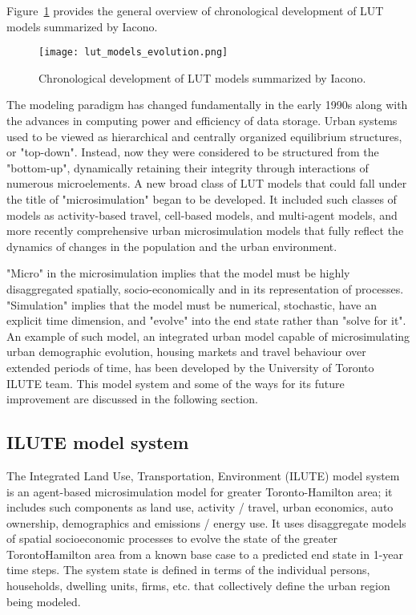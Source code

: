 Figure~\ref{fig:lut_model_evolution} provides the general overview of chronological development of LUT models summarized by Iacono\cite{Iacono2008}.

\begin{figure}[hbt!]
    \centering
    \texttt{[image: lut\_models\_evolution.png]}
    \caption{Chronological development of LUT models summarized by Iacono\cite{Iacono2008}.}
    \label{fig:lut_model_evolution}
\end{figure}

The modeling paradigm has changed fundamentally in the early 1990s along with the advances in computing power and efficiency of data storage.
Urban systems used to be viewed as hierarchical and centrally organized equilibrium structures, or "top-down".
Instead, now they were considered to be structured from the "bottom-up", dynamically retaining their integrity through interactions of numerous microelements\cite{Batty2008}.
A new broad class of LUT models that could fall under the title of "microsimulation" began to be developed.
It included such classes of models as activity-based travel, cell-based models, and multi-agent models, and more recently comprehensive urban microsimulation models that fully reflect the dynamics of changes in the population and the urban environment\cite{Iacono2008}.

"Micro" in the microsimulation implies that the model must be highly disaggregated spatially, socio-economically and in its representation of processes.
"Simulation" implies that the model must be numerical, stochastic, have an explicit time dimension, and "evolve" into the end state rather than "solve for it"\cite{Miller2018c}.
An example of such model, an integrated urban model capable of microsimulating urban demographic evolution, housing markets and travel behaviour over extended periods of time\cite{Miller2018a}, has been developed by the University of Toronto ILUTE team.
This model system and some of the ways for its future improvement are discussed in the following section.

\subsection{ILUTE model system} \label{subsec:ilute}

The Integrated Land Use, Transportation, Environment (ILUTE) model system is an agent-based microsimulation model for greater Toronto-Hamilton area;
it includes such components as land use, activity / travel, urban economics, auto ownership, demographics and emissions / energy use.
It uses disaggregate models of spatial socioeconomic processes to evolve the state of the greater Toronto\textendash Hamilton area from a known base case to a predicted end state in 1-year time steps.
The system state is defined in terms of the individual persons, households, dwelling units, firms, etc.
that collectively define the urban region being modeled\cite{Miller2011}.

